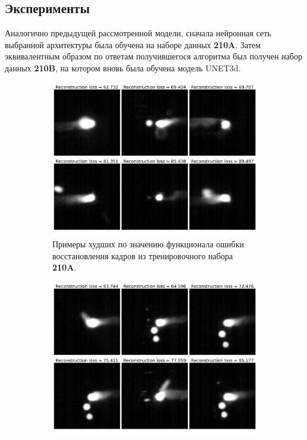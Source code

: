 \documentclass{article}
\begin{document}
\subsection{Эксперименты}
    Аналогично предыдущей рассмотренной модели, сначала нейронная сеть выбранной архитектуры была обучена на наборе данных \textbf{210A}. Затем эквивалентным образом по ответам получившегося алгоритма был получен набор данных \textbf{210B}, на котором вновь была обучена модель UNET3d.

    \begin{figure}[H]
        \centering
        \begin{subfigure}{.47\textwidth}
            \centering
            \includegraphics[scale=.15]{unet_train_worst_before.pdf}
            \caption{Примеры худших по значению функционала ошибки восстановления кадров из тренировочного набора \textbf{210A}.}\label{unet_train_worst_before}
        \end{subfigure}
        \hfill
        \begin{subfigure}{.47\textwidth}
            \centering
            \includegraphics[scale=.15]{unet_test_worst_before.pdf}

\end{subfigure}
\end{figure}
\end{document}
